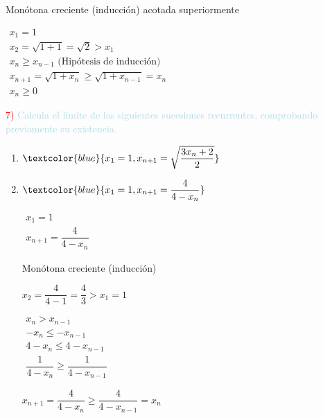 Monótona creciente (inducción) acotada superiormente

$\begin{array}{l}
	x_1=1\\
	x_2=\sqrt{1+1}=\sqrt{2}>x_1\\
	x_n\ge x_{n-1}\text{ (Hipótesis de inducción)}\\
	x_{n+1}=\sqrt{1+x_n}\ge\sqrt{1+x_{n-1}}=x_n\\
	x_n\ge 0
\end{array}$


\textcolor{red}{7)} \textcolor{lightblue}{Calcula el límite de las siguientes sucesiones recurrentes, comprobando previamente su existencia.}

\begin{enumerate}[label=\color{red}\alph*), leftmargin=*]
	\item $\textcolor{blue}{x_1=1,x_{n+1}=\sqrt{\dfrac{3x_n+2}{2}}}$
	\item $\textcolor{blue}{x_1=1,x_{n+1}=\dfrac{4}{4-x_n}}$
	
	$\begin{array}{l}
		x_1=1\\
		x_{n+1}=\dfrac{4}{4-x_n}
	\end{array}$
	
	Monótona creciente (inducción)
	
	$x_2=\dfrac{4}{4-1}=\dfrac{4}{3}>x_1=1$
	
	$\begin{array}{l}
		x_n> x_{n-1}\\
		-x_n\le -x_{n-1}\\
		4-x_n\le 4-x_{n-1}\\
		\dfrac{1}{4-x_n}\ge \dfrac{1}{4-x_{n-1}}
	\end{array}$
	
	$x_{n+1}=\dfrac{4}{4-x_n}\ge\dfrac{4}{4-x_{n-1}}=x_n$
\end{enumerate}